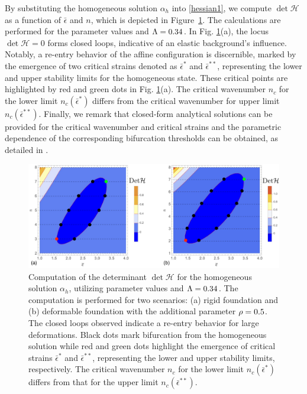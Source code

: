 % 
By substituting the homogeneous solution $\alpha_h$ into \eqref{hessian1}, we compute $\det \mathcal{H}$ as a function of $\bar \epsilon$ and $n$, which is depicted in Figure~\ref{fig:hessian1}. The calculations are performed for the parameter values  and $\Lambda=0.34$.
In Fig. \ref{fig:hessian1}(a), the locus $\det \mathcal H=0$ forms closed loops, indicative of an elastic background's influence. Notably, a re-entry behavior of the affine configuration is discernible, marked by the emergence of two critical strains denoted as $\bar\epsilon^*$ and $\bar\epsilon^{**}$, representing the lower and upper stability limits for the homogeneous state. These critical points are highlighted by red and green dots in Fig. \ref{fig:hessian1}(a). The critical wavenumber $n_c$ for the lower limit $n_c(\bar{\epsilon}^*)$    differs from the critical wavenumber for  upper limit $n_c(\bar{\epsilon}^{**})$. Finally, we remark that closed-form analytical solutions can be provided for the critical wavenumber and critical strains and the parametric dependence of the corresponding bifurcation thresholds can be obtained, as detailed in \cite{Salman2021-mn}.


\begin{figure}
     \centering
     \includegraphics[scale=0.25]{./final_images/fig1.pdf}
\caption{
Computation of the determinant $\det \mathcal{H}$ for the homogeneous solution $\alpha_h$, utilizing parameter values  and $\Lambda = 0.34$. The computation is performed for two scenarios: (a) rigid foundation and (b) deformable foundation with the additional parameter $\rho =0.5$. The closed loops observed indicate a re-entry behavior for large deformations. Black dots mark bifurcation from the homogeneous solution while red and green dots highlight the emergence of critical strains $\bar{\epsilon}^*$ and $\bar{\epsilon}^{**}$, representing the lower and upper stability limits, respectively. The critical wavenumber $n_c$ for the lower limit $n_c(\bar{\epsilon}^*)$ differs from that for the upper limit $n_c(\bar{\epsilon}^{**})$.}
     \label{fig:hessian1}
 \end{figure}

